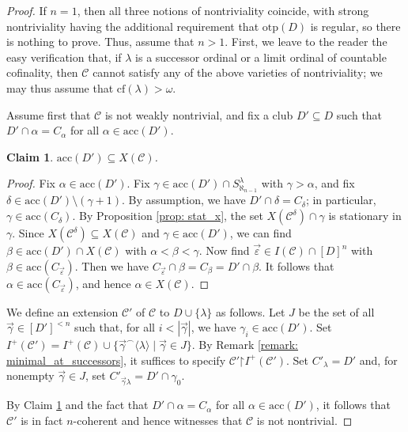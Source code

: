 \documentclass{amsart}
\numberwithin{theorem}{section}
\newtheorem{claim}{Claim}[theorem]
\theoremstyle{definition}
\newcommand{\restr}{\mathord{\upharpoonright}}
\newcommand{\cf}{\mathrm{cf}}
\newcommand{\otp}{\mathrm{otp}}
\newcommand{\acc}{\mathrm{acc}}
\newcommand{\mc}{\mathcal}
\newcommand{\C}{\mathcal{C}}
\begin{document}
\begin{proof}
  If $n = 1$, then all 
  three notions of nontriviality coincide, with strong nontriviality having 
  the additional requirement that $\otp(D)$ is regular, 
  so there is nothing to prove. Thus, assume 
  that $n > 1$. First, we leave to the reader the easy verification that, 
  if $\lambda$ is a successor ordinal or a limit ordinal of countable cofinality, then 
  $\mc{C}$ cannot satisfy any of the above varieties of nontriviality; we may 
  thus assume that $\cf(\lambda) > \omega$.
  
  Assume first that $\mc{C}$ is not weakly nontrivial, and fix 
  a club $D' \subseteq D$ such that $D' \cap \alpha = C_\alpha$ for all 
  $\alpha \in \acc(D')$. 
  
  \begin{claim} \label{claim: x_s}
    $\acc(D') \subseteq X(\mc{C})$.  
  \end{claim}
  
  \begin{proof}
    Fix $\alpha \in \acc(D')$. Fix $\gamma \in \acc(D') \cap S^\lambda_{\aleph_{n-1}}$ 
    with $\gamma > \alpha$, and fix $\delta \in \acc(D') \setminus (\gamma + 1)$. 
    By assumption, we have $D' \cap \delta = C_\delta$; in particular, 
    $\gamma \in \acc(C_\delta)$. By Proposition 
    \ref{prop: stat_x}, the set $X(\mc{C}^\delta) \cap \gamma$ is stationary 
    in $\gamma$. Since $X(\mc{C}^\delta) \subseteq X(\mc{C})$ and $\gamma \in 
    \acc(D')$, we can find $\beta \in \acc(D') \cap X(\mc{C})$ with 
    $\alpha < \beta < \gamma$. Now find $\vec{\varepsilon} \in I(\mc{C}) \cap 
    [D]^n$ with $\beta \in \acc({C_{\vec{\varepsilon}}})$. Then we have 
    $C_{\vec{\varepsilon}} \cap \beta = C_\beta = D' \cap \beta$. It follows 
    that $\alpha \in \acc(C_{\vec{\varepsilon}})$, and hence $\alpha \in 
    X(\mc{C})$.
  \end{proof}
  
  We define an extension $\mc{C'}$ of $\mc{C}$ to $D \cup \{\lambda\}$ 
  as follows. Let $J$ be the set of all $\vec{\gamma} \in [D']^{<n}$ such that, for 
  all $ i < |\vec{\gamma}|$, we have $\gamma_i \in \acc(D')$. Set 
  $I^+(\mc{C}') = I^+(\mc{C}) \cup \{\vec{\gamma}^\frown\langle \lambda \rangle \mid 
  \vec{\gamma} \in J\}$. By Remark \ref{remark: minimal_at_successors}, it suffices to specify $\C'\restr I^+(\C')$. Set $C'_\lambda = D'$ and, for nonempty 
  $\vec{\gamma} \in J$, set $C'_{\vec\gamma\lambda}=D'\cap \gamma_0$. 

  By Claim \ref{claim: x_s} and the fact that $D' \cap \alpha = C_\alpha$ 
  for all $\alpha \in \acc(D')$, it follows that $\mc{C'}$ is in fact 
  $n$-coherent and hence witnesses that $\mc{C}$ is not nontrivial.
  

\end{proof}
\end{document}
